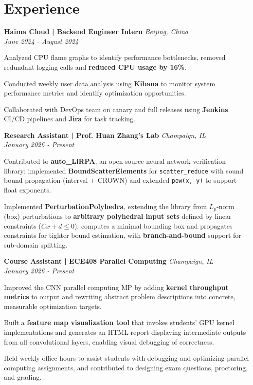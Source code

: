 \documentclass[10pt, a4paper]{article}
\newcommand{\resumeItem}[1]{
  \item\small{
    {#1 \vspace{-2pt}}
  }
}
\newcommand{\resumeSubheadingItalic}[4]{
  \textbf{\large #1} \hfill \small{\textit{#2}} \\
  \textit{\small#3} \hfill \small{\textit{#4}}
  \vspace{2pt}
}
\begin{document}
\section{Experience}
\vspace{-5pt}
\resumeSubheadingItalic
{Haima Cloud | Backend Engineer Intern}{Beijing, China}
{June 2024 - August 2024}{}
\begin{resumeItemList}
  \resumeItem{Analyzed CPU flame graphs to identify performance bottlenecks, removed redundant logging calls and \textbf{reduced CPU usage by 16\%}.}
  \resumeItem{Conducted weekly user data analysis using \textbf{Kibana} to monitor system performance metrics and identify optimization opportunities.}
  \resumeItem{Collaborated with DevOps team on canary and full releases using \textbf{Jenkins} CI/CD pipelines and \textbf{Jira} for task tracking.}
\end{resumeItemList}
\vspace{4pt}

\resumeSubheadingItalic
{Research Assistant | Prof. Huan Zhang's Lab}{Champaign, IL}
{January 2026 - Present}{}
\begin{resumeItemList}
  \resumeItem{Contributed to \textbf{auto\_LiRPA}, an open-source neural network verification library: implemented \textbf{BoundScatterElements} for \texttt{scatter\_reduce} with sound bound propagation (interval + CROWN) and extended \texttt{pow(x, y)} to support float exponents.}
  \resumeItem{Implemented \textbf{PerturbationPolyhedra}, extending the library from $L_p$-norm (box) perturbations to \textbf{arbitrary polyhedral input sets} defined by linear constraints ($Cx + d \leq 0$); computes a minimal bounding box and propagates constraints for tighter bound estimation, with \textbf{branch-and-bound} support for sub-domain splitting.}
\end{resumeItemList}
\vspace{4pt}

\resumeSubheadingItalic
{Course Assistant | ECE408 Parallel Computing}{Champaign, IL}
{January 2026 - Present}{}
\begin{resumeItemList}
  \resumeItem{Improved the CNN parallel computing MP by adding \textbf{kernel throughput metrics} to output and rewriting abstract problem descriptions into concrete, measurable optimization targets.}
  \resumeItem{Built a \textbf{feature map visualization tool} that invokes students' GPU kernel implementations and generates an HTML report displaying intermediate outputs from all convolutional layers, enabling visual debugging of correctness.}
  \resumeItem{Held weekly office hours to assist students with debugging and optimizing parallel computing assignments, and contributed to designing exam questions, proctoring, and grading.}
\end{resumeItemList}
\end{document}
